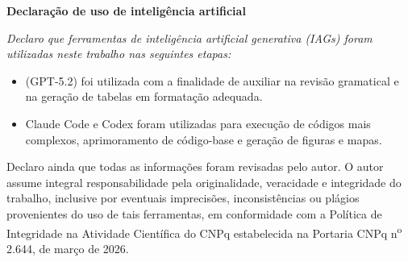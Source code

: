 \documentclass[
	11pt,				%
	oneside,			%
	a4paper,			%
	english,			%
	english				%
	]{abntex2ppgsi}
\theoremstyle{plain}
\theoremstyle{remark}
\theoremstyle{plain}%
\theoremstyle{remark}%
\begin{document}
\frenchspacing 


%
% 
%
\imprimircapa

\imprimirfolhaderosto*

\begin{fichacatalografica}
    
\end{fichacatalografica}

\cleardoublepage
{}
\thispagestyle{empty}
\begin{center}
\textbf{Declaração de uso de inteligência artificial}
\end{center}
\vspace*{\fill}
\noindent\hfill
\begin{minipage}{0.82\textwidth}
\itshape
Declaro que ferramentas de inteligência artificial generativa (IAGs) foram utilizadas neste trabalho nas seguintes etapas: 
\begin{itemize} 
\item (GPT‑5.2) foi utilizada com a finalidade de auxiliar na revisão gramatical e na geração de tabelas em formatação adequada. 
\item Claude Code e Codex foram utilizadas para execução de códigos mais complexos, aprimoramento de código-base e geração de figuras e mapas. 
\end{itemize}
Declaro ainda que todas as informações foram revisadas pelo autor. O
autor assume integral responsabilidade pela originalidade, veracidade e
integridade do trabalho, inclusive por eventuais imprecisões, inconsistências ou
plágios provenientes do uso de tais ferramentas, em conformidade com a
Política de Integridade na Atividade Científica do CNPq estabelecida na
Portaria CNPq n\textsuperscript{o} 2.644, de março de 2026.
\end{minipage}
\vspace*{\fill}
\cleardoublepage
\end{document}
